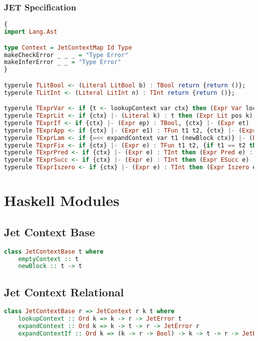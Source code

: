 \subsection{JET Specification}
\begin{lstlisting}[language=Haskell]
{
import Lang.Ast

type Context = JetContextMap Id Type
makeCheckError _ _ _ = "Type Error"
makeInferError _ _ = "Type Error"
}

typerule TLitBool <- (Literal LitBool b) : TBool return {return ()};
typerule TLitInt <- (Literal LitInt n) : TInt return {return ()};

typerule TExprVar <- if {t <- lookupContext var ctx} then (Expr Var loc var) : t return {return ()};
typerule TExprLit <- if {ctx} |- (Literal k) : t then (Expr Lit pos k) : t return {return ()} ;
typerule TExprIf <- if {ctx} |- (Expr ep) : TBool, {ctx} |- (Expr et) : t, {ctx} |- (Expr ef) : t then (Expr If ep et ef) : t return {return ()};
typerule TExprApp <- if {ctx} |- (Expr e1) : TFun t1 t2, {ctx} |- (Expr e2) : t1 then (Expr App e1 e2) : t2 return {return ()};
typerule TExprLam <- if {=<< expandContext var t1 (newBlock ctx)} |- (Expr e) : t2 then (Expr Lam var t1 e) : TFun t1 t2 return {return ()};
typerule TExprFix <- if {ctx} |- (Expr e) : TFun t1 t2, {if t1 == t2 then return () else fail "Type error"} then (Expr Fix e) : t1 return {return ()};
typerule TExprPred <- if {ctx} |- (Expr e) : TInt then (Expr Pred e) : TInt return {return ()};
typerule TExprSucc <- if {ctx} |- (Expr e) : TInt then (Expr ESucc e) : TInt return {return ()};
typerule TExprIszero <- if {ctx} |- (Expr e) : TInt then (Expr Iszero e) : TBool return {return ()};
\end{lstlisting}

\chapter{Haskell Modules}
\label{appendix:modules}
\section{Jet Context Base}
\begin{lstlisting}[language=Haskell]
class JetContextBase t where
    emptyContext :: t
    newBlock :: t -> t
\end{lstlisting}
\section{Jet Context Relational}
\begin{lstlisting}[language=Haskell]
class JetContextBase r => JetContext r k t where
    lookupContext :: Ord k => k -> r -> JetError t
    expandContext :: Ord k => k -> t -> r -> JetError r
    expandContextIf :: Ord k => (k -> r -> Bool) -> k -> t -> r -> JetError r
\end{lstlisting}
